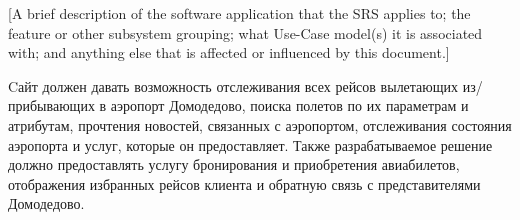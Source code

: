 [A brief description of the software application 
that the SRS applies to; the feature or other 
subsystem grouping; what Use-Case model(s) it 
is associated with;  and anything else that is 
affected or influenced by this document.]

Cайт должен давать возможность отслеживания 
всех рейсов вылетающих из/прибывающих в 
аэропорт Домодедово, поиска полетов по их 
параметрам и атрибутам, прочтения новостей, 
связанных с аэропортом, отслеживания состояния 
аэропорта и услуг, которые он предоставляет. 
Также разрабатываемое решение должно предоставлять 
услугу бронирования и приобретения авиабилетов, 
отображения избранных рейсов клиента и обратную 
связь с представителями Домодедово.